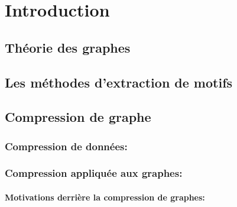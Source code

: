 \documentclass[11pt,a4paper]{report}
\theoremstyle{definition}
\begin{document}







\tableofcontents
\newpage

\listoffigures
{}
\cleardoublepage


\listoftables
{}
\cleardoublepage



\part{Introduction} 


	\chapter{ Théorie des graphes}
	  
	
	\chapter{Les méthodes d'extraction de motifs}

	\chapter{Compression de graphe}
	
		\section{Compression de données: }
			
			
		
		\section{Compression appliquée aux graphes:}
	
			\subsection{Motivations derrière la compression de graphes: }
	
\end{document}
